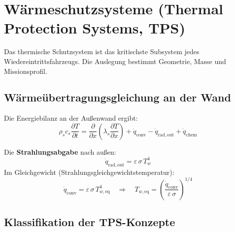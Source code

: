 ﻿\documentclass[12pt,a4paper]{article}
\begin{document}
\section{Wärmeschutzsysteme (Thermal Protection Systems, TPS)}

Das thermische Schutzsystem ist das kritischste Subsystem jedes Wiedereintrittsfahrzeugs.
Die Auslegung bestimmt Geometrie, Masse und Missionsprofil.

\subsection{Wärmeübertragungsgleichung an der Wand}

Die Energiebilanz an der Außenwand ergibt:
\[
  \rho_s c_s \frac{\partial T}{\partial t}
    = \frac{\partial}{\partial x}\!\left(\lambda_s \frac{\partial T}{\partial x}\right)
    + \dot{q}_{\mathrm{conv}} - \dot{q}_{\mathrm{rad,out}} + \dot{q}_{\mathrm{chem}}
\]

Die \textbf{Strahlungsabgabe} nach außen:
\[
  \dot{q}_{\mathrm{rad,out}} = \varepsilon\,\sigma\,T_w^4
\]
Im Gleichgewicht (Strahlungsgleichgewichtstemperatur):
\[
  \dot{q}_{\mathrm{conv}} = \varepsilon\,\sigma\,T_{w,\mathrm{eq}}^4
  \quad\Rightarrow\quad
  T_{w,\mathrm{eq}} = \left(\frac{\dot{q}_{\mathrm{conv}}}{\varepsilon\,\sigma}\right)^{1/4}
\]

\subsection{Klassifikation der TPS-Konzepte}
\end{document}
